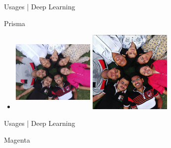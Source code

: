 \documentclass[10pt]{beamer}
\begin{document}
	\begin{frame}{Usages | Deep Learning}
		\begin{center}
			
			
			\large{ Prisma}
			\begin{itemize}
			\item\includegraphics[width=40mm,height=40mm ]{images/somnath_14}  \includegraphics[width=40mm,height=40mm  ]{images/somnath_15}
			
		\end{itemize}	
		\end{center}
	\end{frame}
	\begin{frame}{Usages | Deep Learning}
		\begin{center}
			
			
			\large{Magenta}
			
			
			
			
		\end{center}
	\end{frame}
	
\end{document}
